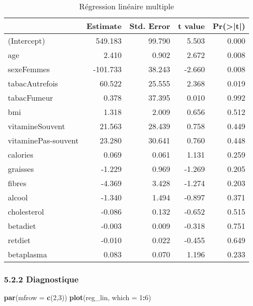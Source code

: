 \documentclass[]{article}
\newenvironment{Shaded}{\begin{snugshade}}{\end{snugshade}}
\newcommand{\KeywordTok}[1]{\textcolor[rgb]{0.13,0.29,0.53}{\textbf{#1}}}
\newcommand{\DataTypeTok}[1]{\textcolor[rgb]{0.13,0.29,0.53}{#1}}
\newcommand{\DecValTok}[1]{\textcolor[rgb]{0.00,0.00,0.81}{#1}}
\newcommand{\OperatorTok}[1]{\textcolor[rgb]{0.81,0.36,0.00}{\textbf{#1}}}
\newcommand{\NormalTok}[1]{#1}
\begin{document}
\begin{table}

\caption{\label{tab:unnamed-chunk-45}Régression linéaire multiple}
\centering
\begin{tabular}[t]{l|r|r|r|r}
\hline
  & Estimate & Std. Error & t value & Pr(>|t|)\\
\hline
\rowcolor[HTML]{BBD2E1}  (Intercept) & 549.183 & 99.790 & 5.503 & 0.000\\
\hline
age & 2.410 & 0.902 & 2.672 & 0.008\\
\hline
\rowcolor[HTML]{BBD2E1}  sexeFemmes & -101.733 & 38.243 & -2.660 & 0.008\\
\hline
tabacAutrefois & 60.522 & 25.555 & 2.368 & 0.019\\
\hline
\rowcolor[HTML]{BBD2E1}  tabacFumeur & 0.378 & 37.395 & 0.010 & 0.992\\
\hline
bmi & 1.318 & 2.009 & 0.656 & 0.512\\
\hline
\rowcolor[HTML]{BBD2E1}  vitamineSouvent & 21.563 & 28.439 & 0.758 & 0.449\\
\hline
vitaminePas-souvent & 23.280 & 30.641 & 0.760 & 0.448\\
\hline
\rowcolor[HTML]{BBD2E1}  calories & 0.069 & 0.061 & 1.131 & 0.259\\
\hline
graisses & -1.229 & 0.969 & -1.269 & 0.205\\
\hline
\rowcolor[HTML]{BBD2E1}  fibres & -4.369 & 3.428 & -1.274 & 0.203\\
\hline
alcool & -1.340 & 1.494 & -0.897 & 0.371\\
\hline
\rowcolor[HTML]{BBD2E1}  cholesterol & -0.086 & 0.132 & -0.652 & 0.515\\
\hline
betadiet & -0.003 & 0.009 & -0.318 & 0.751\\
\hline
\rowcolor[HTML]{BBD2E1}  retdiet & -0.010 & 0.022 & -0.455 & 0.649\\
\hline
betaplasma & 0.083 & 0.070 & 1.196 & 0.233\\
\hline
\end{tabular}
\end{table}

\subsubsection{5.2.2 Diagnostique}\label{diagnostique}

\begin{Shaded}
\begin{Highlighting}[]
\KeywordTok{par}\NormalTok{(}\DataTypeTok{mfrow =} \KeywordTok{c}\NormalTok{(}\DecValTok{2}\NormalTok{,}\DecValTok{3}\NormalTok{))}
\KeywordTok{plot}\NormalTok{(reg_lin, }\DataTypeTok{which =} \DecValTok{1}\OperatorTok{:}\DecValTok{6}\NormalTok{)}
\end{Highlighting}
\end{Shaded}
\end{document}
